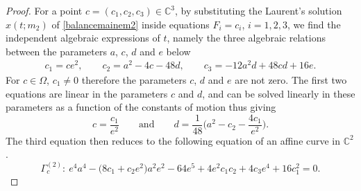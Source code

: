 \documentclass[pdftex]{sigma}
\numberwithin{equation}{section}
\begin{document}
\begin{proof}
For a point $c=(c_1,c_2,c_3) \in \mathbb{C}^3$, by
substituting the Laurent's solution $x(t;m_2)$ of
\eqref{balancemainem2} inside equations $F_i=c_i$, $i=1,2,3$, we find
the independent algebraic expressions of $t$, namely the three
algebraic relations between the parameters $a$, $c$, $d$ and $e$ below
\begin{eqnarray*}
 c_1 = ce^2, \qquad
 c_2 = a^2-4c-48d, \qquad
 c_3 = -12a^2d+48cd+16e.
\end{eqnarray*}
For $c\in \Omega$, $c_1\neq0$ therefore the parameters $c$, $d$ and $e$
are not zero. The first two equations are linear in the parameters
$c$ and $d$, and can be solved linearly in these parameters as a
function of the constants of motion thus giving
\begin{equation*}
 c=\frac{c_1}{e^2} \qquad \text{and} \qquad
 d=\frac{1}{48}\biggl(a^2-c_2-\frac{4c_1}{e^2}\biggr).
\end{equation*}
The third equation then reduces to the following equation of an
affine curve in $\mathbb{C}^2$.
\begin{equation}\label{courbeaffine}
 \Gamma_c^{(2)}\colon \ e^4a^4-\bigl(8c_1+c_2e^2\bigr)a^2e^2-64e^5+4e^2c_1c_2+4c_3e^4+16c_1^2=0.
\end{equation}


\end{proof}
\end{document}

